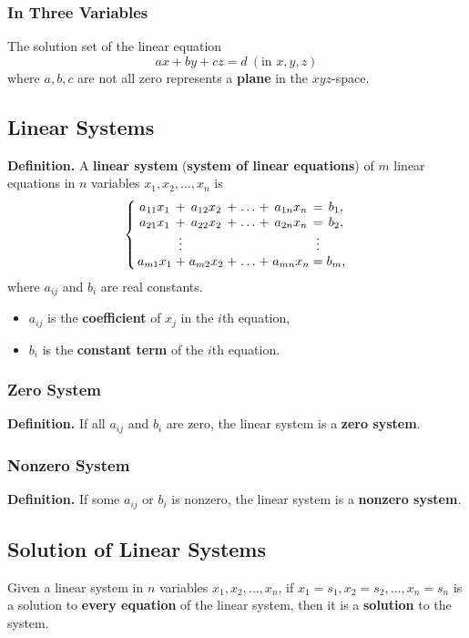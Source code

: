 \documentclass[../ma2001_notes.tex]{subfiles}
\begin{document}
\subsubsection{In Three Variables}
The solution set of the linear equation
\[ax+by+cz=d\ (\text{in }x,y,z)\]
where \(a,b,c\) are not all zero represents a \textbf{plane} in the \(xyz\)-space.

\subsection{Linear Systems}
\textbf{Definition.} A \textbf{linear system} (\textbf{system of linear equations}) of \(m\) linear equations in \(n\) variables \(x_1, x_2, \ldots, x_n\) is
\[\left\{
\arraycolsep=1.4pt
\begin{array}{ccccccccc}
	a_{11}x_1 & + & a_{12}x_2 & + & \ldots & + & a_{1n}x_n & = & b_1, \\
	a_{21}x_1 & + & a_{22}x_2 & + & \ldots & + & a_{2n}x_n & = & b_2, \\
	& \vdots & & & & & & \vdots & \\
	a_{m1}x_1 & + & a_{m2}x_2 & + & \ldots & + & a_{mn}x_n & = & b_m,
\end{array}\right.
\]
where \(a_{ij}\) and \(b_i\) are real constants.
\begin{itemize}
	\item \(a_{ij}\) is the \textbf{coefficient} of \(x_j\) in the \(i\)th equation,
	\item \(b_i\) is the \textbf{constant term} of the \(i\)th equation.
\end{itemize}

\subsubsection{Zero System}
\textbf{Definition.} If all \(a_{ij}\) and \(b_i\) are zero, the linear system is a \textbf{zero system}.

\subsubsection{Nonzero System}
\textbf{Definition.} If some \(a_{ij}\) or \(b_i\) is nonzero, the linear system is a \textbf{nonzero system}.

\subsection{Solution of Linear Systems}
Given a linear system in \(n\) variables \(x_1, x_2, \ldots, x_n\), if \(x_1=s_1, x_2=s_2, \ldots, x_n=s_n\) is a solution to \textbf{every equation} of the linear system, then it is a \textbf{solution} to the system.
\end{document}
